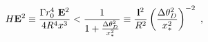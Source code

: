 \begin{equation}
H {\bf E}^2\equiv \frac {\Gamma r_0^4\ {\bf E}^2 }{4R^4 x^3} 
<\frac{1}{1+ 
\frac{\Delta 
\theta_D^2}{x_*^2}}\equiv \frac {{\bf l}^2 }{R^2} 
\left(\frac{\Delta\theta_D^2}{x_*^2}\right) 
^{-2}\ ,
\label{inequality}
\end{equation}

